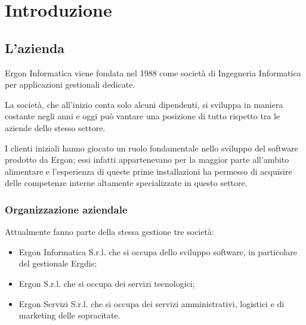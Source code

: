 
\chapter{Introduzione}
\label{cap:introduzione}

\section{L'azienda}

Ergon Informatica viene fondata nel 1988 come società di Ingegneria Informatica per applicazioni gestionali dedicate.

La società, che all'inizio conta solo alcuni dipendenti, si sviluppa in maniera costante negli anni e oggi può vantare una posizione di tutto rispetto tra le aziende dello stesso settore.

I clienti iniziali hanno giocato un ruolo fondamentale nello sviluppo del software prodotto da Ergon; essi infatti appartenevano per la maggior parte all'ambito alimentare e l'esperienza di queste prime installazioni ha permesso di acquisire delle competenze interne altamente specializzate in questo settore. 
\subsection{Organizzazione aziendale}
Attualmente fanno parte della stessa gestione tre società:

\begin{itemize}
\item Ergon Informatica S.r.l. che si occupa dello sviluppo software, in particolare del gestionale Ergdis;
\item Ergon S.r.l. che si occupa dei servizi tecnologici;
\item Ergon Servizi S.r.l. che si occupa dei servizi amministrativi, logistici e di marketing delle sopracitate.
\end{itemize}
\newpage
